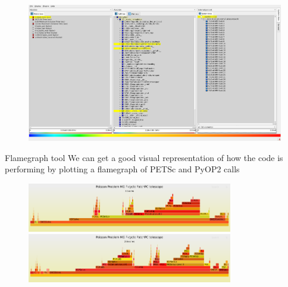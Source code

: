 \documentclass[pdf,aspectratio=169]{beamer}
\begin{document}
\begin{frame}
\begin{figure}
	\includegraphics[width=\textwidth]{cube.png}
\end{figure}
\end{frame}

\begin{frame}{Flamegraph tool}
We can get a good visual representation of how the code is performing by plotting a flamegraph of PETSc and PyOP2 calls
\begin{figure}
	\includegraphics[width=0.8\textwidth]{32_flame.pdf}
	\includegraphics[width=0.8\textwidth]{256_flame.pdf}
\end{figure}
\end{frame}
\end{document}
